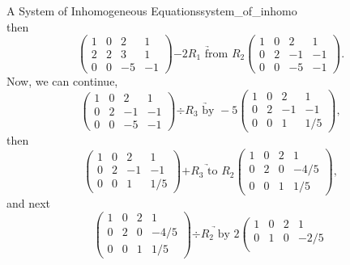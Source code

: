 \begin{ex}{A System of Inhomogeneous Equations}{system_of_inhomo}
\[        \]
        then
        \[
        \left(\begin{array}{ccc|c}
        1 & 0 & 2 & 1 \\
        2 & 2 & 3 & 1 \\
        0 & 0 & -5 & -1
        \end{array}\right) \underrightarrow{-2 R_1 \textrm{ from } R_2} 
        \left(\begin{array}{ccc|c}
        1 & 0 & 2 & 1 \\
        0 & 2 & -1 & -1 \\
        0 & 0 & -5 & -1
        \end{array}\right).     
        \]
        Now, we can continue,
        \[
        \left(\begin{array}{ccc|c}
        1 & 0 & 2 & 1 \\
        0 & 2 & -1 & -1 \\
        0 & 0 & -5 & -1
        \end{array}\right) \underrightarrow{\div R_3 \textrm{ by }  -5} 
        \left(\begin{array}{ccc|c}
        1 & 0 & 2 & 1 \\
        0 & 2 & -1 & -1 \\
        0 & 0 & 1 & 1/5
        \end{array}\right),    
        \]
        then
        \[
        \left(\begin{array}{ccc|c}
        1 & 0 & 2 & 1 \\
        0 & 2 & -1 & -1 \\
        0 & 0 & 1 & 1/5
        \end{array}\right) \underrightarrow{ +R_3 \textrm{ to }  R_2} 
        \left(\begin{array}{ccc|c}
        1 & 0 & 2 & 1 \\
        0 & 2 & 0 & -4/5 \\
        0 & 0 & 1 & 1/5
        \end{array}\right),    
        \]
        and next
        \[
        \left(\begin{array}{ccc|c}
        1 & 0 & 2 & 1 \\
        0 & 2 & 0 & -4/5 \\
        0 & 0 & 1 & 1/5
        \end{array}\right) \underrightarrow{ \div R_2 \textrm{ by }  2} 
        \left(\begin{array}{ccc|c}
        1 & 0 & 2 & 1 \\
        0 & 1 & 0 & -2/5 \\

\end{array}\]
\end{ex}
